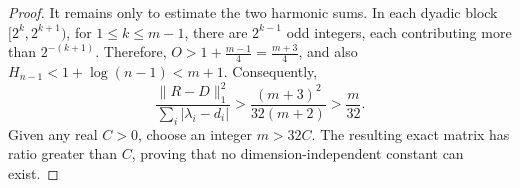 \begin{cxrefutation}
\begin{proof}
It remains only to estimate the two harmonic sums.  In each dyadic block
$[2^k,2^{k+1})$, for $1\leq k\leq m-1$, there are $2^{k-1}$ odd integers,
each contributing more than $2^{-(k+1)}$.  Therefore, $O>1+\frac{m-1}{4}=\frac{m+3}{4}$, and also $ H_{n-1}<1+\log(n-1)<m+1$. Consequently,
\[
  \frac{\lVert R-D\rVert_1^2}
       {\sum_i|\lambda_i-d_i|}
  >\frac{(m+3)^2}{32(m+2)}
  >\frac{m}{32}.
\]
Given any real $C>0$, choose an integer $m>32C$.  The resulting exact matrix
has ratio greater than $C$, proving that no dimension-independent constant can
exist.
\end{proof}

\end{cxrefutation}


